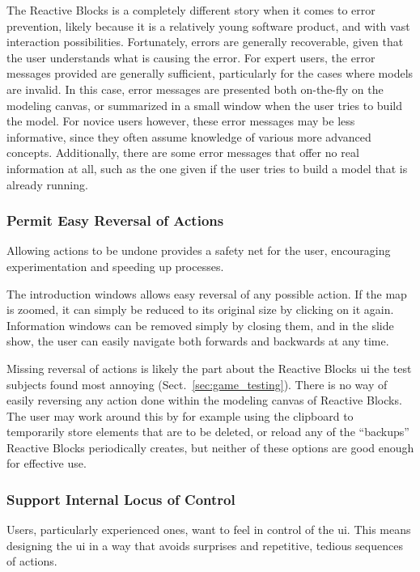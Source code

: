 \noindent
The Reactive Blocks is a completely different story when it comes to error prevention, likely because it is a relatively young software product, and with vast interaction possibilities. Fortunately, errors are generally recoverable, given that the user understands what is causing the error. For expert users, the error messages provided are generally sufficient, particularly for the cases where models are invalid. In this case, error messages are presented both on-the-fly on the modeling canvas, or summarized in a small window when the user tries to build the model. For novice users however, these error messages may be less informative, since they often assume knowledge of various more advanced concepts. Additionally, there are some error messages that offer no real information at all, such as the one given if the user tries to build a model that is already running.

\subsubsection{Permit Easy Reversal of Actions}
Allowing actions to be undone provides a safety net for the user, encouraging experimentation and speeding up processes.

\noindent
The introduction windows allows easy reversal of any possible action. If the map is zoomed, it can simply be reduced to its original size by clicking on it again. Information windows can be removed simply by closing them, and in the slide show, the user can easily navigate both forwards and backwards at any time.

\noindent
Missing reversal of actions is likely the part about the Reactive Blocks \gls{ui} the test subjects found most annoying (Sect.~\ref{sec:game_testing}). There is no way of easily reversing any action done within the modeling canvas of Reactive Blocks. The user may work around this by for example using the clipboard to temporarily store elements that are to be deleted, or reload any of the ``backups'' Reactive Blocks periodically creates, but neither of these options are good enough for effective use.

\subsubsection{Support Internal Locus of Control}
Users, particularly experienced ones, want to feel in control of the \gls{ui}. This means designing the \gls{ui} in a way that avoids surprises and repetitive, tedious sequences of actions.

